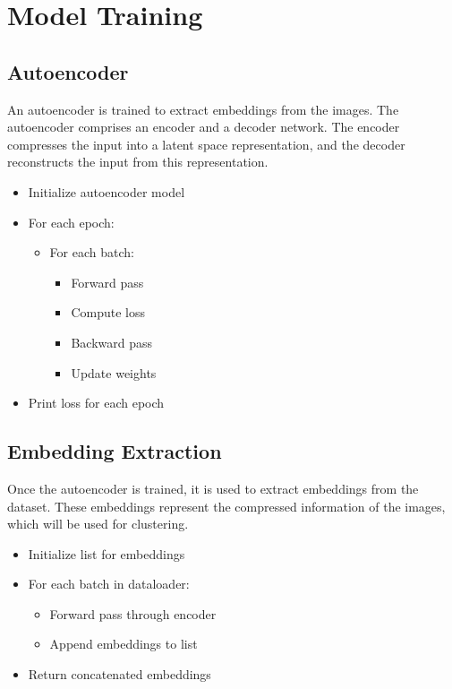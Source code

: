 \section{Model Training}
\subsection{Autoencoder}
An autoencoder is trained to extract embeddings from the images. The autoencoder comprises an encoder and a decoder network. The encoder compresses the input into a latent space representation, and the decoder reconstructs the input from this representation.

\begin{schema}
    \begin{itemize}
        \item Initialize autoencoder model
        \item For each epoch:
        \begin{itemize}
            \item For each batch:
            \begin{itemize}
                \item Forward pass
                \item Compute loss
                \item Backward pass
                \item Update weights
            \end{itemize}
        \end{itemize}
        \item Print loss for each epoch
    \end{itemize}
\end{schema}

\subsection{Embedding Extraction}
Once the autoencoder is trained, it is used to extract embeddings from the dataset. These embeddings represent the compressed information of the images, which will be used for clustering.

\begin{schema}
    \begin{itemize}
        \item Initialize list for embeddings
        \item For each batch in dataloader:
        \begin{itemize}
            \item Forward pass through encoder
            \item Append embeddings to list
        \end{itemize}
        \item Return concatenated embeddings
    \end{itemize}
\end{schema}

